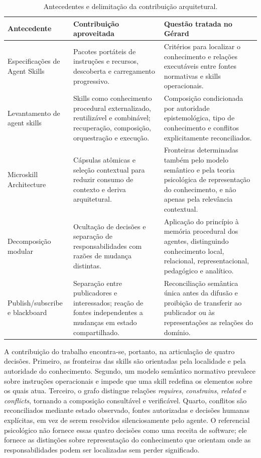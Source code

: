 \documentclass[preprint,12pt,authoryear]{elsarticle}
\begin{document}
\begin{table}[ht]
\centering
\small
\caption{Antecedentes e delimitação da contribuição arquitetural.}
\label{tab:antecedentes-skills}
\begin{tabularx}{\textwidth}{p{3.2cm}XX}
\toprule
\textbf{Antecedente} & \textbf{Contribuição aproveitada} & \textbf{Questão tratada no Gérard}\\
\midrule
Especificações de Agent Skills \citep{openai2026skills,microsoft2026skills} & Pacotes portáteis de instruções e recursos, descoberta e carregamento progressivo. & Critérios para localizar o conhecimento e relações executáveis entre fontes normativas e skills operacionais.\\
Levantamento de agent skills \citep{badhe2026survey} & Skills como conhecimento procedural externalizado, reutilizável e combinável; recuperação, composição, orquestração e execução. & Composição condicionada por autoridade epistemológica, tipo de conhecimento e conflitos explicitamente reconciliados.\\
Microskill Architecture \citep{zare2026microskill} & Cápsulas atômicas e seleção contextual para reduzir consumo de contexto e deriva arquitetural. & Fronteiras determinadas também pelo modelo semântico e pela teoria psicológica de representação do conhecimento, e não apenas pela relevância contextual.\\
Decomposição modular \citep{parnas1972criteria} & Ocultação de decisões e separação de responsabilidades com razões de mudança distintas. & Aplicação do princípio à memória procedural dos agentes, distinguindo conhecimento local, relacional, representacional, pedagógico e analítico.\\
Publish/subscribe e blackboard \citep{eugster2003many,nii1986blackboard} & Separação entre publicadores e interessados; reação de fontes independentes a mudanças em estado compartilhado. & Reconciliação semântica única antes da difusão e proibição de transferir ao publicador ou às representações as relações do domínio.\\
\bottomrule
\end{tabularx}
\end{table}

A contribuição do trabalho encontra-se, portanto, na articulação de quatro decisões. Primeiro, as fronteiras das skills são orientadas pela localidade e pela autoridade do conhecimento. Segundo, um modelo semântico normativo prevalece sobre instruções operacionais e impede que uma skill redefina os elementos sobre os quais atua. Terceiro, o grafo distingue relações \emph{requires}, \emph{constrains}, \emph{related} e \emph{conflicts}, tornando a composição consultável e verificável. Quarto, conflitos são reconciliados mediante estado observado, fontes autorizadas e decisões humanas explícitas, em vez de serem resolvidos silenciosamente pelo agente. O referencial psicológico não fornece essas quatro decisões como uma receita de software; ele fornece as distinções sobre representação do conhecimento que orientam onde as responsabilidades podem ser localizadas sem perder significado.
\end{document}
